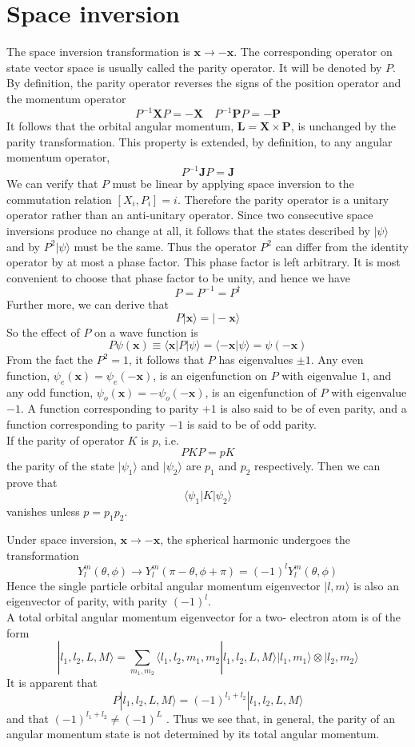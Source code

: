 \section{Space inversion}
The space inversion transformation is $\bm{x} \to -\bm{x}$. The corresponding operator on state vector space is usually called the parity operator. It will be denoted by $P$. By definition, the parity operator reverses the signs of the position operator and the momentum operator
\[P^{-1}\bm{X}P = -\bm{X} \quad P^{-1}\bm{P}P = -\bm{P}\]
It follows that the orbital angular momentum, $\bm{L} = \bm{X}\times\bm{P}$, is unchanged by the parity transformation. This property is extended, by definition, to any angular momentum operator,
\[P^{-1}\bm{J}P = \bm{J}\]
We can verify that $P$ must be linear by applying space inversion to the commutation relation $[X_i,P_i] = i$. Therefore the parity operator is a unitary operator rather than an anti-unitary operator. Since two consecutive space inversions produce no change at all, it follows that the states described by $|\psi\rangle$ and by $P^2|\psi\rangle$ must be the same. Thus the
operator $P^2$ can differ from the identity operator by at most a phase factor. This phase factor is left arbitrary. It is most convenient to choose that phase factor to be unity, and hence we have
\[P = P^{-1} = P^{\dagger}\]
Further more, we can derive that
\[P|\bm{x}\rangle = |-\bm{x}\rangle\]
So the effect of $P$ on a wave function is
\[P\psi(\bm{x}) \equiv \langle \bm{x} | P | \psi\rangle = \langle -\bm{x} | \psi\rangle = \psi(-\bm{x})\]
From the fact the $P^2=1$, it follows that $P$ has eigenvalues $\pm 1$. Any even function, $\psi_e(\bm{x}) = \psi_e(-\bm{x})$, is an eigenfunction on $P$ with eigenvalue $1$, and any odd function, $\psi_o(\bm{x}) = -\psi_o(-\bm{x})$, is an eigenfunction of $P$ with eigenvalue $-1$.
A function corresponding to parity $+1$ is also said to be of even parity, and a function corresponding to parity $-1$ is said to be of odd parity.
\\
If the parity of operator $K$ is $p$, i.e. 
\[PKP = pK\] 
the parity of the state $|\psi_1\rangle$ and $|\psi_2\rangle$ are $p_1$ and $p_2$ respectively. Then we can prove that 
\[\langle \psi_1 | K | \psi_2 \rangle\]
vanishes unless $p = p_1 p_2$.

\begin{example}
Under space inversion, $\bm{x} \to -\bm{x}$, the spherical harmonic undergoes the transformation
\[Y_l^m(\theta,\phi) \to Y_l^m(\pi-\theta,\phi+\pi) = (-1)^l Y_l^m(\theta,\phi)\]
Hence the single particle orbital angular momentum eigenvector $|l,m\rangle$ is also an eigenvector of parity, with parity $(-1)^l$.
\\
A total orbital angular momentum eigenvector for a two-
electron atom is of the form
\[|l_1,l_2,L,M\rangle = \sum_{m_1,m_2}  \langle l_1,l_2,m_1,m_2 | l_1,l_2,L,M\rangle |l_1,m_1\rangle \otimes |l_2,m_2\rangle\]
It is apparent that
\[P|l_1,l_2,L,M\rangle = (-1)^{l_1+l_2}|l_1,l_2,L,M\rangle\]
and that $(-1)^{l_1+l_2} \neq (-1)^{L}$ . Thus we see that, in general, the parity of an angular momentum state is not determined by its total angular momentum.
\end{example}

